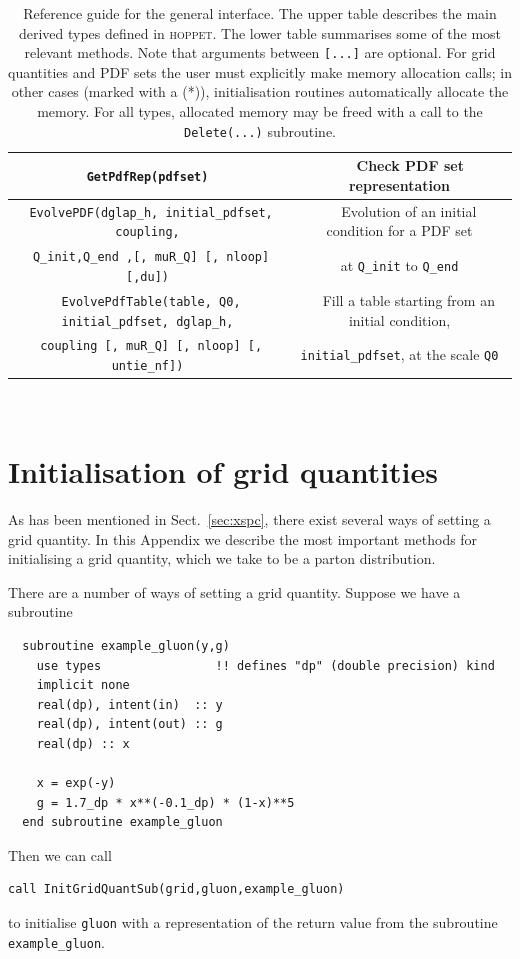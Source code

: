 \documentclass[12pt]{article}
\newcommand{\hoppet}{\textsc{hoppet}\xspace}
\newcommand{\ttt}[1]{\texttt{#1}}
\begin{document}
\begin{table}
\begin{center}
\begin{tabular}{|c|c|}
\hline
\texttt{
GetPdfRep(pdfset)
} & ~~
Check PDF set representation \\
\hline
\texttt{
 EvolvePDF(dglap\_h, initial\_pdfset, coupling,}
 & ~~
Evolution of an initial condition for a PDF set \\
\texttt{ Q\_init,Q\_end ,[, muR\_Q] [, nloop] [,du])} 
& at {\tt Q\_init} to  {\tt Q\_end} \\
\hline
\texttt{
 EvolvePdfTable(table, Q0, initial\_pdfset, dglap\_h,} 
 & ~~ 
Fill a table starting from an initial condition,\\
\texttt{ coupling  [, muR\_Q] [, nloop] [, untie\_nf])} 
& \ttt{initial\_pdfset}, at the scale {\tt Q0} \\ 
\hline
\end{tabular} \\
\end{center}
\caption{\label{tab:general}
Reference guide for the general interface.
The upper table describes the main
derived types defined in \hoppet.
%
The lower table summarises some of the most relevant methods. Note that arguments
between \texttt{[...]} are optional. For grid quantities and PDF sets
the user must explicitly make memory allocation calls; in other cases
(marked with a (*)), initialisation routines automatically
allocate the memory. For all types, allocated memory may be freed with
a call to the \ttt{Delete(...)} subroutine. }
\end{table}




\section{Initialisation of grid quantities}
\label{sec:gridinit}
As has been mentioned in
Sect.~\ref{sec:xspc},  
there exist several ways of setting a grid quantity. In this
Appendix we describe the most important methods for initialising
a grid quantity, which we take to be a parton distribution.

There are a number of ways of setting a grid quantity. Suppose we have
a subroutine
\begin{lstlisting}
  subroutine example_gluon(y,g)
    use types                !! defines "dp" (double precision) kind
    implicit none
    real(dp), intent(in)  :: y
    real(dp), intent(out) :: g
    real(dp) :: x
    
    x = exp(-y)
    g = 1.7_dp * x**(-0.1_dp) * (1-x)**5 
  end subroutine example_gluon
\end{lstlisting}
Then we can call
\begin{lstlisting}
call InitGridQuantSub(grid,gluon,example_gluon)
\end{lstlisting}
to initialise \texttt{gluon} with a representation of the return value
from the subroutine \texttt{example\_gluon}.
\end{document}
